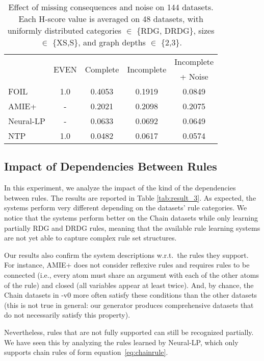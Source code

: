 \documentclass[letterpaper]{article} \usepackage{aaai20}  \usepackage{times}  \usepackage{helvet} \usepackage{courier}  \usepackage[hyphens]{url}  \usepackage{graphicx} \urlstyle{rm} \def\UrlFont{\rm}  \usepackage{graphicx}  \frenchspacing  \setlength{\pdfpagewidth}{8.5in}  \setlength{\pdfpageheight}{11in}  \usepackage{amsthm}
\theoremstyle{definition}
\def\eqref#1{equation~\ref{#1}}
\newcommand{\tool}{\text{RuDaS}\xspace}
\begin{document}
\begin{table}[h!]
    \centering
\small
    \begin{tabular}{lcccc}
    \toprule
&\multirow{2}{*}{EVEN} &  \multirow{2}{*}{Complete} & \multirow{2}{*}{Incomplete}& Incomplete \\& & & & + Noise \\
     \midrule
     FOIL & 1.0 & 0.4053 &	0.1919 &	0.0849 \\
     AMIE+ & - &  0.2021 &	0.2098 &	0.2075 \\
     Neural-LP&  - & 0.0633 &	0.0692 &	0.0649 \\
     NTP  & 1.0 & 0.0482 &	0.0617 &	0.0574 \\
     \bottomrule
    \end{tabular}
    \caption{Effect of missing consequences and noise on 144 datasets. Each H-score value is averaged on 48 datasets, with uniformly distributed categories $\in$ \{RDG, DRDG\}, sizes $\in$ \{XS,S\}, and graph depths $\in$ \{2,3\}.}
    \label{tab:results_2}
\end{table}
\subsection{Impact of Dependencies Between Rules}\label{sec:rule-dep-exps}
In this experiment, we analyze the impact of the kind of the dependencies between rules.
The results are reported in Table \ref{tab:result_3}. As expected, the systems perform very different depending on the datasets' rule categories. We notice that the systems perform better on the Chain datasets while only learning partially RDG and DRDG rules, meaning that the available rule learning systems are not yet able to capture complex rule set structures.


Our results also confirm the system descriptions w.r.t.\ the rules they support. For instance, AMIE+ does not consider reflexive rules and requires rules to be connected (i.e., every atom must share an argument with each of the other atoms of the rule) and closed (all variables appear at least twice).
And, by chance, the Chain datasets in \tool-v0 more often satisfy these conditions than the other datasets (this is not true in general: our generator produces comprehensive datasets that do not necessarily satisfy this property).

Nevertheless, rules that are not fully supported can still be recognized partially. We have seen this by analyzing the rules learned by Neural-LP, which only supports chain rules of form \eqref{eq:chainrule}.
\end{document}
